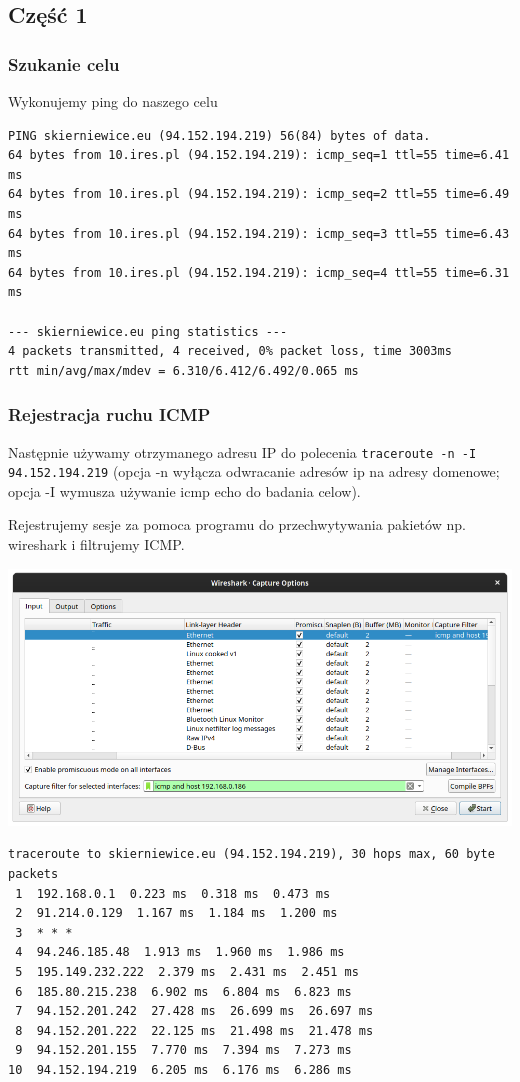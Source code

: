 \documentclass[11pt]{article}
\begin{document}
\subsection{Część 1}
\label{sec:orgcb6e7aa}
\subsubsection{Szukanie celu}
\label{sec:orga172832}
Wykonujemy ping do naszego celu
\begin{verbatim}
PING skierniewice.eu (94.152.194.219) 56(84) bytes of data.
64 bytes from 10.ires.pl (94.152.194.219): icmp_seq=1 ttl=55 time=6.41 ms
64 bytes from 10.ires.pl (94.152.194.219): icmp_seq=2 ttl=55 time=6.49 ms
64 bytes from 10.ires.pl (94.152.194.219): icmp_seq=3 ttl=55 time=6.43 ms
64 bytes from 10.ires.pl (94.152.194.219): icmp_seq=4 ttl=55 time=6.31 ms

--- skierniewice.eu ping statistics ---
4 packets transmitted, 4 received, 0% packet loss, time 3003ms
rtt min/avg/max/mdev = 6.310/6.412/6.492/0.065 ms

\end{verbatim}
\subsubsection{Rejestracja ruchu ICMP}
\label{sec:orga53b5c9}
Następnie używamy otrzymanego adresu IP do polecenia \texttt{traceroute -n -I 94.152.194.219} (opcja -n wyłącza odwracanie adresów ip na adresy domenowe; opcja -I wymusza używanie icmp echo do badania celow).


Rejestrujemy sesje za pomoca programu do przechwytywania pakietów np. wireshark i filtrujemy ICMP.
\begin{center}
\includegraphics[width=.9\linewidth]{./part1/options.png}
\end{center}

\begin{verbatim}
traceroute to skierniewice.eu (94.152.194.219), 30 hops max, 60 byte packets
 1  192.168.0.1  0.223 ms  0.318 ms  0.473 ms
 2  91.214.0.129  1.167 ms  1.184 ms  1.200 ms
 3  * * *
 4  94.246.185.48  1.913 ms  1.960 ms  1.986 ms
 5  195.149.232.222  2.379 ms  2.431 ms  2.451 ms
 6  185.80.215.238  6.902 ms  6.804 ms  6.823 ms
 7  94.152.201.242  27.428 ms  26.699 ms  26.697 ms
 8  94.152.201.222  22.125 ms  21.498 ms  21.478 ms
 9  94.152.201.155  7.770 ms  7.394 ms  7.273 ms
10  94.152.194.219  6.205 ms  6.176 ms  6.286 ms
\end{verbatim}
\end{document}
